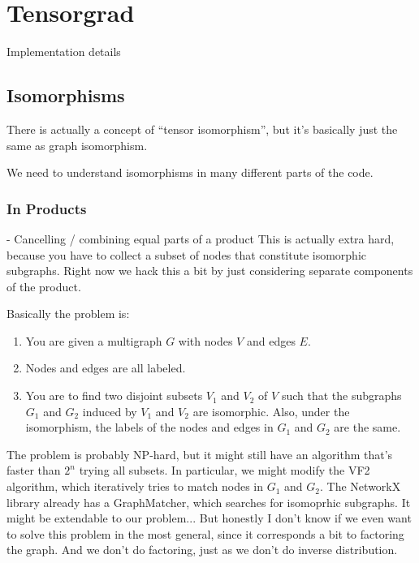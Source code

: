 
\chapter{Tensorgrad}

Implementation details

\section{Isomorphisms}
There is actually a concept of ``tensor isomorphism'', but it's basically just the same as graph isomorphism.

We need to understand isomorphisms in many different parts of the code.

\subsection{In Products}
- Cancelling / combining equal parts of a product
This is actually extra hard, because you have to collect a subset of nodes that constitute isomorphic subgraphs.
Right now we hack this a bit by just considering separate components of the product.

\begin{figure}[h]
\end{figure}

Basically the problem is:
\begin{enumerate}
   \item You are given a multigraph $G$ with nodes $V$ and edges $E$.
   \item Nodes and edges are all labeled.
   \item You are to find two disjoint subsets $V_1$ and $V_2$ of $V$ such that the subgraphs $G_1$ and $G_2$ induced by $V_1$ and $V_2$ are isomorphic.
      Also, under the isomorphism, the labels of the nodes and edges in $G_1$ and $G_2$ are the same.
\end{enumerate}

The problem is probably NP-hard, but it might still have an algorithm that's faster than
$2^n$ trying all subsets.
In particular, we might modify the VF2 algorithm, which iteratively tries to match nodes in $G_1$ and $G_2$.
The NetworkX library already has a GraphMatcher, which searches for isomoprhic subgraphs.
It might be extendable to our problem...
But honestly I don't know if we even want to solve this problem in the most general, since it corresponds a bit to factoring the graph.
And we don't do factoring, just as we don't do inverse distribution.

